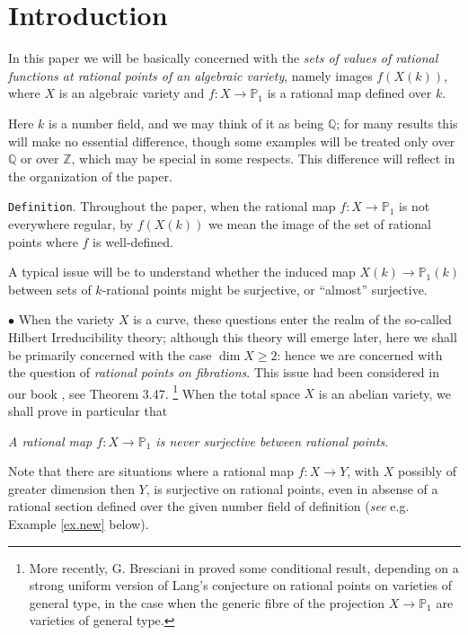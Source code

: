 \documentclass[leqno,12pt]{article} %
\def\Z{{{\mathbb Z}}}
\def\Q{{{\mathbb Q}}}
\def\P{{{\mathbb P}}}
\theoremstyle{plain} %
\theoremstyle{definition} %
\begin{document}
\section{Introduction} \label{S.Int} 

In this paper we will be basically concerned with the  {\it sets of values of rational functions at  rational points of  an  algebraic  variety}, namely images $f(X(k))$, where $X$ is an  algebraic variety and  $f:X\to \P_1$ is a rational map defined over $k$.  

Here $k$ is a number field, and we may think of it as being $\Q$; for many results this will make no essential difference, though  some examples will be treated only over $\Q$ or over $\Z$, which may be special in some respects. This difference will reflect in the organization of the paper.

\smallskip

{\tt Definition}. Throughout the paper, when the rational map $f:X\to \P_1$ is not everywhere regular, by $f(X(k))$ we mean the image of the set of rational points where $f$ is well-defined.

\smallskip




 A typical issue will be to understand whether the induced map $X(k)\to \P_1(k)$  between sets of $k$-rational points might be surjective, or ``almost'' surjective.
\smallskip

$\bullet$ When the variety $X$ is a curve, these questions enter the realm of the so-called Hilbert Irreducibility theory; although this theory will emerge later, here we shall be primarily concerned with the case $\dim X\geq 2$: hence we are concerned with the question of {\it rational points on fibrations}.  This issue had been considered in our book \cite{CZ-libro}, see Theorem 3.47. 
\footnote{More recently, G. Bresciani in \cite{B} proved some conditional result, depending on a strong uniform version of  Lang's conjecture on rational points on varieties of general type, in the case when the generic fibre of the projection $X\to \P_1$ are varieties of general type.}
When the total space $X$ is an abelian variety, we shall prove in particular that


\smallskip

 {\it A rational map $f:X\to \P_1$ is never surjective between rational points}. 
 
 \smallskip
 
 Note that there are situations where a  rational map  $f: X\to Y$, with $X$ possibly of greater dimension then $Y$, is surjective on rational points, even in absense of a rational section defined over the given number field of definition  ({\it see} e.g. Example \ref{ex.new} below).
 \smallskip
 
\end{document}
